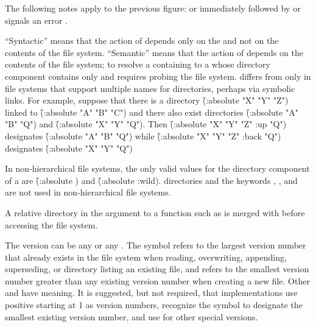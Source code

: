 
The following notes apply to the previous figure:
\beginlist
\itemitem{}
 or  
immediately followed by  or 
  signals an error .
 
\itemitem{}
  ``Syntactic'' means that the action of 
 depends only on the 
  and not on the contents of the file system.  
``Semantic'' means that the
  action of  depends on the contents of the file system; to resolve
  a  containing 
 to a  whose directory component
  contains only  and 
 requires probing the file system.
 differs from 
 only in file systems that support multiple
  names for directories, perhaps via symbolic links.  For example,
  suppose that there is a directory
\f{(:absolute "X" "Y" "Z")}
  linked to 
\f{(:absolute "A" "B" "C")}
  and there also exist directories
\f{(:absolute "A" "B" "Q")} and 
\f{(:absolute "X" "Y" "Q")}.
Then
\f{(:absolute "X" "Y" "Z" :up "Q")}
  designates
\f{(:absolute "A" "B" "Q")}
  while
\f{(:absolute "X" "Y" "Z" :back "Q")}
  designates
\f{(:absolute "X" "Y" "Q")}
\endlist 

\itemitem{--}
  In non-hierarchical file systems, the only valid  values for the
  directory component of a  are \f{(:absolute )} 
  and \f{(:absolute :wild)}.   directories and the keywords
  , , and  are not used 
  in non-hierarchical file systems.
 
\itemitem{--}
  A relative directory in the  argument to a function such as
   is merged with  
  before accessing the file system.
\endlist
{}
 
  
\itemitem{\bull}
The version can be any  or any .  
The symbol 
    refers to the largest version number that already exists in the file
    system when reading, overwriting, appending, superseding, or directory
    listing an existing file, and refers to the smallest version number
    greater than any existing version number when creating a new file.
    Other  and 
 have  meaning.
    It is suggested, but not required, that implementations use positive
starting at 1 as version numbers, recognize the symbol 
    to designate the smallest existing version number, and use 
for other special versions.
\endlist 

